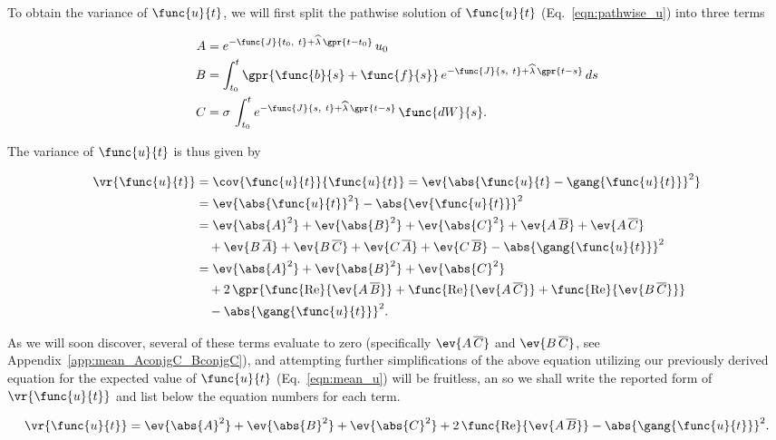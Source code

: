 To obtain the variance of $\func{u}{t}$, we will first split the pathwise solution of $\func{u}{t}$ (Eq.~\ref{eqn:pathwise_u}) into three terms

\begin{align}
    A &= e^{-\func{J}{t_0,\ t} + \widehat{\lambda}\,\gpr{t - t_0}}\,u_0 \label{eqn:A} \\
    B &= \int_{t_0}^{t} \gpr{\func{b}{s} + \func{f}{s}}\,e^{-\func{J}{s,\ t} + \widehat{\lambda}\,\gpr{t - s}}\,ds \label{eqn:B} \\
    C &= \sigma\,\int_{t_{0}}^{t} e^{-\func{J}{s,\ t} + \widehat{\lambda}\,\gpr{t - s}}\,\func{dW}{s}. \label{eqn:C}
\end{align}

The variance of $\func{u}{t}$ is thus given by

\begin{align}
    \vr{\func{u}{t}} &= \cov{\func{u}{t}}{\func{u}{t}} = \ev{\abs{\func{u}{t} - \gang{\func{u}{t}}}^2} \nonumber \\
    	&= \ev{\abs{\func{u}{t}}^2} - \abs{\ev{\func{u}{t}}}^2 \nonumber \\
    	&= \ev{\abs{A}^2} + \ev{\abs{B}^2} + \ev{\abs{C}^2} + \ev{A\,\overline{B}} + \ev{A\,\overline{C}} \nonumber \\
    	&\quad + \ev{B\,\overline{A}} + \ev{B\,\overline{C}} + \ev{C\,\overline{A}} + \ev{C\,\overline{B}} - \abs{\gang{\func{u}{t}}}^2 \nonumber \\
    	&= \ev{\abs{A}^2} + \ev{\abs{B}^2} + \ev{\abs{C}^2} \nonumber \\
    		&\quad + 2\,\gpr{\func{\text{Re}}{\ev{A\,\overline{B}}} + \func{\text{Re}}{\ev{A\,\overline{C}}} + \func{\text{Re}}{\ev{B\,\overline{C}}}} \nonumber \\
    		&\quad - \abs{\gang{\func{u}{t}}}^2.
\end{align}

As we will soon discover, several of these terms evaluate to zero (specifically $\ev{A\,\overline{C}}$ and $\ev{B\,\overline{C}}$, see Appendix~\ref{app:mean_AconjgC_BconjgC}), and attempting further simplifications of the above equation utilizing our previously derived equation for the expected value of $\func{u}{t}$ (Eq.~\ref{eqn:mean_u}) will be fruitless, an so we shall write the reported form of $\vr{\func{u}{t}}$ and list below the equation numbers for each term.

\begin{equation}
	\vr{\func{u}{t}} = \ev{\abs{A}^2} + \ev{\abs{B}^2} + \ev{\abs{C}^2} + 2\,\func{\text{Re}}{\ev{A\,\overline{B}}} - \abs{\gang{\func{u}{t}}}^2.
	\label{eqn:var_u}
\end{equation}

